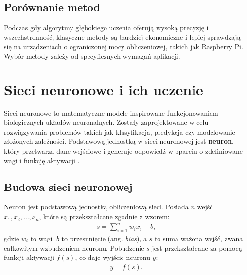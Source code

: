\documentclass[a4paper,twoside,12pt]{book}
\begin{document}
\subsection{Porównanie metod}
Podczas gdy algorytmy głębokiego uczenia oferują wysoką precyzję i wszechstronność, klasyczne metody są bardziej ekonomiczne i lepiej sprawdzają się na urządzeniach o ograniczonej mocy obliczeniowej, takich jak Raspberry Pi. Wybór metody zależy od specyficznych wymagań aplikacji.

\section{Sieci neuronowe i ich uczenie}
Sieci neuronowe to matematyczne modele inspirowane funkcjonowaniem biologicznych układów neuronalnych. Zostały zaprojektowane w celu rozwiązywania problemów takich jak klasyfikacja, predykcja czy modelowanie złożonych zależności. Podstawową jednostką w sieci neuronowej jest \textbf{neuron}, który przetwarza dane wejściowe i generuje odpowiedź w oparciu o zdefiniowane wagi i funkcję aktywacji \cite{bib:bielecki}.

\subsection{Budowa sieci neuronowej}
Neuron jest podstawową jednostką obliczeniową sieci. Posiada \(n\) wejść \(x_1, x_2, \ldots, x_n\), które są przekształcane zgodnie z wzorem:
\begin{align}
    s = \sum_{i=1}^n w_i x_i + b,
\end{align}
gdzie \(w_i\) to wagi, \(b\) to przesunięcie (ang. \textit{bias}), a \(s\) to suma ważona wejść, zwana całkowitym wzbudzeniem neuronu. Pobudzenie \(s\) jest przekształcane za pomocą funkcji aktywacji \(f(s)\), co daje wyjście neuronu \(y\):
\begin{align}
    y = f(s).
\end{align}
\end{document}
